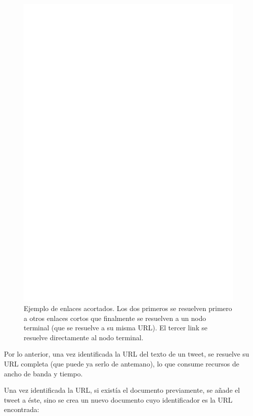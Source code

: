 \documentclass[upright, contnum]{umemoria}
\begin{document}
  \begin{figure}[h]
  \centering
  \includegraphics[width=16cm]{./dia/shortlinks.ps}
  \caption[Ejemplo de enlaces acortados.]
   {Ejemplo de enlaces acortados. Los dos primeros se resuelven
  primero a otros enlaces cortos que finalmente se resuelven a un
  nodo terminal (que se resuelve a su misma URL). El tercer link se
  resuelve directamente al nodo terminal.\label{fig:short}}
  \end{figure}

    Por lo anterior, una vez identificada la URL del texto de un
    tweet, se resuelve su URL completa (que puede ya serlo de
    antemano), lo que consume recursos de ancho de banda y
    tiempo. 

    Una vez identificada la URL, si existía el documento previamente,
    se añade el tweet a éste, sino se crea un nuevo documento cuyo
    identificador es la URL encontrada:
\end{document}
